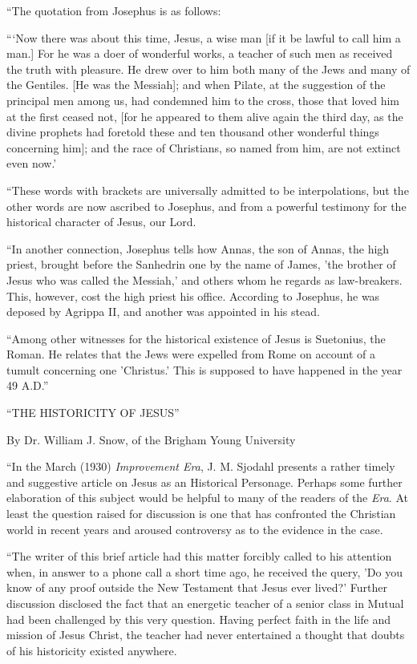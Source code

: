 ``The quotation from Josephus is as follows:

```Now there was about this time, Jesus, a wise man [if it be lawful to call him a man.] For he
was a doer of wonderful works, a teacher of such men as received the truth with pleasure. He
drew over to him both many of the Jews and many of the Gentiles. [He was the Messiah];
and when Pilate, at the suggestion of the principal men among us, had condemned him to the
cross, those that loved him at the first ceased not, [for he appeared to them alive again the
third day, as the divine prophets had foretold these and ten thousand other wonderful things
concerning him]; and the race of Christians, so named from him, are not extinct even now.'

``These words with brackets are universally admitted to be interpolations, but the other words
are now ascribed to Josephus, and from a powerful testimony for the historical character of
Jesus, our Lord.

``In another connection, Josephus tells how Annas, the son of Annas, the high priest, brought
before the Sanhedrin one by the name of James, 'the brother of Jesus who was called the
Messiah,' and others whom he regards as law-breakers. This, however, cost the high priest
his office. According to Josephus, he was deposed by Agrippa II, and another was appointed
in his stead.

``Among other witnesses for the historical existence of Jesus is Suetonius, the Roman. He
relates that the Jews were expelled from Rome on account of a tumult concerning one
'Christus.' This is supposed to have happened in the year 49 A.D.''

``THE HISTORICITY OF JESUS''

By Dr. William J. Snow, of the Brigham Young University

``In the March (1930) \textit{Improvement Era}, J. M. Sjodahl presents a rather timely and suggestive
article on Jesus as an Historical Personage. Perhaps some further elaboration of this subject
would be helpful to many of the readers of the \textit{Era}. At least the question raised for discussion
is one that has confronted the Christian world in recent years and aroused controversy as to
the evidence in the case.

``The writer of this brief article had this matter forcibly called to his attention when, in answer
to a phone call a short time ago, he received the query, 'Do you know of any proof outside
the New Testament that Jesus ever lived?' Further discussion disclosed the fact that an
energetic teacher of a senior class in Mutual had been challenged by this very question.
Having perfect faith in the life and mission of Jesus Christ, the teacher had never entertained
a thought that doubts of his historicity existed anywhere.

